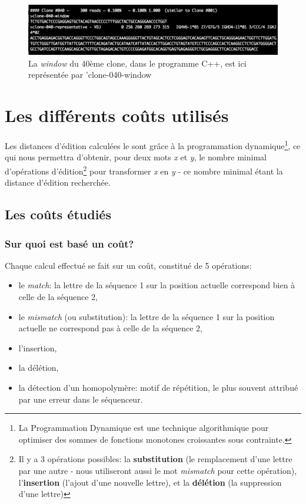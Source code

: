 \documentclass[pdftex,12pt,a4paper]{report}
\begin{document}
\begin{spacing}{1.2}
\begin{figure}[H]
\begin{center}
	\includegraphics[scale=0.6]{img/C++-window.jpg}
\end{center}
\caption{La \textit{window} du 40ème clone, dans le programme C++, est ici représentée par 'clone-040-window}
\end{figure}

\section{Les différents coûts utilisés}

Les distances d'édition calculées le sont grâce à la programmation dynamique\footnote{La Programmation Dynamique est une technique algorithmique pour optimiser des sommes de fonctions monotones croissantes sous contrainte.}, ce qui nous permettra d'obtenir, pour deux mots \textit{x} et \textit{y}, le nombre minimal d’opérations d’édition\footnote{Il y a 3 opérations possibles: la \textbf{substitution} (le remplacement d'une lettre par une autre - nous utiliseront aussi le mot \textit{mismatch} pour cette opération), l'\textbf{insertion} (l'ajout d'une nouvelle lettre), et la \textbf{délétion} (la suppression d'une lettre)} pour transformer \textit{x} en \textit{y} - ce nombre minimal étant la distance d'édition recherchée.

\subsection{Les coûts étudiés}

\subsubsection{Sur quoi est basé un coût?}

Chaque calcul effectué se fait sur un coût, constitué de 5 opérations:
\begin{itemize}
\item{le \textit{match}: la lettre de la séquence 1 sur la position actuelle correspond bien à celle de la séquence 2,}
\item{le \textit{mismatch} (ou substitution): la lettre de la séquence 1 sur la position actuelle ne correspond pas à celle de la séquence 2,}
\item{l'insertion,}
\item{la délétion,}
\item{la détection d'un homopolymère: motif de répétition, le plus souvent attribué par une erreur dans le séquenceur.}
\end{itemize}


\end{spacing}
\end{document}
